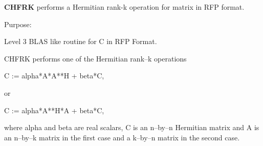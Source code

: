 {\bfseries C\+H\+F\+R\+K} performs a Hermitian rank-\/k operation for matrix in R\+F\+P format. 

 \begin{DoxyParagraph}{Purpose\+: }
\begin{DoxyVerb} Level 3 BLAS like routine for C in RFP Format.

 CHFRK performs one of the Hermitian rank--k operations

    C := alpha*A*A**H + beta*C,

 or

    C := alpha*A**H*A + beta*C,

 where alpha and beta are real scalars, C is an n--by--n Hermitian
 matrix and A is an n--by--k matrix in the first case and a k--by--n
 matrix in the second case.\end{DoxyVerb}
 
\end{DoxyParagraph}

